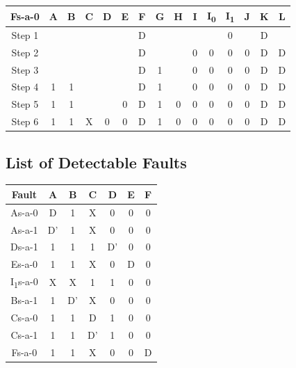 \documentclass[11pt]{report}
\begin{document}
\begin{tabular}{ |c||c|c|c|c|c|c|c|c|c|c|c|c|c|c| }
\hline
\bf Fs-a-0 & \bf A & \bf B & \bf C & \bf D & \bf E & \bf F & G & H & I & I\textsubscript{0} & I\textsubscript{1} & J & K & \bf L \\
\hline
\hline
Step 1 & & & & & & D & & & & & 0 & & D & \\
\hline
Step 2 & & & & & & D & & & 0 & 0 & 0 & 0 & D & D \\
\hline
Step 3 & & & & & & D & 1 & & 0 & 0 & 0 & 0 & D & D \\
\hline
Step 4 & 1 & 1 & & & & D & 1 & & 0 & 0 & 0 & 0 & D & D \\
\hline
Step 5 & 1 & 1 & & & 0 & D & 1 & 0 & 0 & 0 & 0 & 0 & D & D \\
\hline
Step 6 & 1 & 1 & X & 0 & 0 & D & 1 & 0 & 0 & 0 & 0 & 0 & D & D \\
\hline
\end{tabular}

\subsection*{List of Detectable Faults}
\begin{tabular}{|c||c|c|c|c|c|c|}
    \hline
    Fault & A & B & C & D & E & F
    \\
    \hline
    \hline
    As-a-0 & D & 1 & X & 0 & 0 & 0 \\
    \hline
    As-a-1 & D' & 1 & X & 0 & 0 & 0 \\
    \hline
    Ds-a-1 & 1 & 1 & 1 & D' & 0 & 0 \\
    \hline
    Es-a-0 & 1 & 1 & X & 0 & D & 0 \\
    \hline
    I\textsubscript{1}s-a-0 & X & X & 1 & 1 & 0 & 0 \\
    \hline
    Bs-a-1 & 1 & D' & X & 0 & 0 & 0 \\
    \hline
    Cs-a-0 & 1 & 1 & D & 1 & 0 & 0 \\
    \hline
    Cs-a-1 & 1 & 1 & D' & 1 & 0 & 0 \\
    \hline
    Fs-a-0 & 1 & 1 & X & 0 & 0 & D \\
    \hline
\end{tabular}
\end{document}
